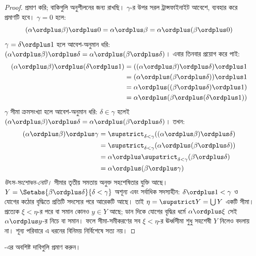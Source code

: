 \documentclass[../../../include/open-logic-section]{subfiles}
\begin{document}
\begin{proof}
 প্রমাণ করি; বাকিগুলি অনুশীলনের জন্য
রাখছি। $\gamma$-র উপর সরল ট্রান্সফাইনাইট আবেশে,
 ব্যবহার করে প্রমাণটি হবে।
$\gamma = 0$ হলে:
\[
(\alpha \ordplus \beta) \ordplus 0 = \alpha \ordplus \beta
= \alpha \ordplus (\beta \ordplus 0)
\]
$\gamma = \delta\ordplus 1$ হলে আবেশ-অনুমান ধরি:
$(\alpha \ordplus \beta) \ordplus \delta = \alpha
\ordplus (\beta \ordplus \delta)$। এবার
 তিনবার প্রয়োগ করে পাই:
\begin{align*}
	(\alpha \ordplus \beta) \ordplus (\delta \ordplus 1)
	&= ((\alpha \ordplus \beta) \ordplus \delta)\ordplus 1\\
	&= (\alpha \ordplus (\beta \ordplus \delta)) \ordplus 1\\
	&= \alpha \ordplus ((\beta \ordplus \delta)\ordplus 1)\\
	&= \alpha \ordplus (\beta \ordplus (\delta\ordplus 1))
\end{align*}
$\gamma$ সীমা ক্রমসংখ্যা হলে আবেশ-অনুমান ধরি:
$\delta \in \gamma$ হলেই $(\alpha \ordplus \beta)
\ordplus \delta = \alpha \ordplus (\beta \ordplus
\delta)$। তখন:
\begin{align*}
	(\alpha \ordplus \beta) \ordplus \gamma
	&= \supstrict_{\delta < \gamma}((\alpha \ordplus \beta) \ordplus \delta) \\
	&= \supstrict_{\delta < \gamma}(\alpha \ordplus (\beta \ordplus \delta))\\
	&= \alpha \ordplus \supstrict_{\delta < \gamma}(\beta \ordplus \delta)\\
	&= \alpha \ordplus (\beta \ordplus \gamma)
\end{align*}
\emph{উৎস-সংশোধন-নোট।} সীমার তৃতীয় সমতায় অনুক্ত
সহশেষিতার যুক্তি আছে। $Y=\Setabs{\beta\ordplus\delta}{\delta<\gamma}$
অশূন্য এবং সর্বাধিক সদস্যহীন: $\delta\ordplus1<\gamma$
ও যোগের কঠোর বৃদ্ধিতে প্রতিটি সদস্যের পরে আরেকটি আছে।
তাই $\eta=\supstrict Y=\bigcup Y$ একটি সীমা।
প্রত্যেক $\xi<\eta$-র পরে বা সমান কোনও $y\in Y$ আছে;
ডান দিকে যোগের বৃদ্ধির ধর্মে $\alpha\ordplus\xi$
সেই $\alpha\ordplus y$-র নিচে বা সমান। ফলে সীমা-সমীকরণের
সব $\xi<\eta$-র ঊর্ধ্বসীমা শুধু সহশেষী $Y$ নিলেও বদলায় না।
শূন্য পরিবারে এ ধরনের বিনিময় নির্বিশেষে সত্য নয়।
\end{proof}

\begin{prob}
-এর
অবশিষ্ট দাবিগুলি প্রমাণ করুন।
\end{prob}
\end{document}
